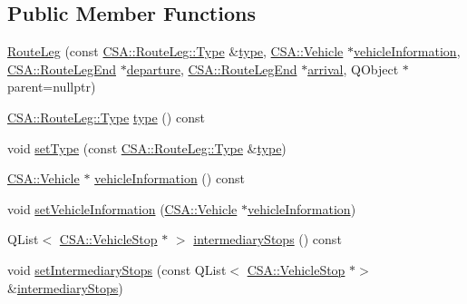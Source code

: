 \subsection*{Public Member Functions}
\begin{DoxyCompactItemize}
\item 
\mbox{\hyperlink{classCSA_1_1RouteLeg_a81e25540ddee7870c6304c6e6efd8490}{Route\+Leg}} (const \mbox{\hyperlink{classCSA_1_1RouteLeg_a464547cf160a77a2014d101560b1f77b}{C\+S\+A\+::\+Route\+Leg\+::\+Type}} \&\mbox{\hyperlink{classCSA_1_1RouteLeg_abbea7d9d097dbf9b7c87543b2a2e8aac}{type}}, \mbox{\hyperlink{classCSA_1_1Vehicle}{C\+S\+A\+::\+Vehicle}} $\ast$\mbox{\hyperlink{classCSA_1_1RouteLeg_a766608f69057a64427736f02de434654}{vehicle\+Information}}, \mbox{\hyperlink{classCSA_1_1RouteLegEnd}{C\+S\+A\+::\+Route\+Leg\+End}} $\ast$\mbox{\hyperlink{classCSA_1_1RouteLeg_adc49bfe6b5aef6f5a2c2bffa72540308}{departure}}, \mbox{\hyperlink{classCSA_1_1RouteLegEnd}{C\+S\+A\+::\+Route\+Leg\+End}} $\ast$\mbox{\hyperlink{classCSA_1_1RouteLeg_a096f128bcfa0e616bfab643f5b2c245f}{arrival}}, Q\+Object $\ast$parent=nullptr)
\item 
\mbox{\hyperlink{classCSA_1_1RouteLeg_a464547cf160a77a2014d101560b1f77b}{C\+S\+A\+::\+Route\+Leg\+::\+Type}} \mbox{\hyperlink{classCSA_1_1RouteLeg_abbea7d9d097dbf9b7c87543b2a2e8aac}{type}} () const
\item 
void \mbox{\hyperlink{classCSA_1_1RouteLeg_a8a175ba408df0aeb3a345f57ce65db5b}{set\+Type}} (const \mbox{\hyperlink{classCSA_1_1RouteLeg_a464547cf160a77a2014d101560b1f77b}{C\+S\+A\+::\+Route\+Leg\+::\+Type}} \&\mbox{\hyperlink{classCSA_1_1RouteLeg_abbea7d9d097dbf9b7c87543b2a2e8aac}{type}})
\item 
\mbox{\hyperlink{classCSA_1_1Vehicle}{C\+S\+A\+::\+Vehicle}} $\ast$ \mbox{\hyperlink{classCSA_1_1RouteLeg_a766608f69057a64427736f02de434654}{vehicle\+Information}} () const
\item 
void \mbox{\hyperlink{classCSA_1_1RouteLeg_a88faef67ebfa683c1ea15f8e672f16c3}{set\+Vehicle\+Information}} (\mbox{\hyperlink{classCSA_1_1Vehicle}{C\+S\+A\+::\+Vehicle}} $\ast$\mbox{\hyperlink{classCSA_1_1RouteLeg_a766608f69057a64427736f02de434654}{vehicle\+Information}})
\item 
Q\+List$<$ \mbox{\hyperlink{classCSA_1_1VehicleStop}{C\+S\+A\+::\+Vehicle\+Stop}} $\ast$ $>$ \mbox{\hyperlink{classCSA_1_1RouteLeg_a6cb78630def68232e02545f8803c7a27}{intermediary\+Stops}} () const
\item 
void \mbox{\hyperlink{classCSA_1_1RouteLeg_aa01b151e07580a55b7fec9a1cadfc9bb}{set\+Intermediary\+Stops}} (const Q\+List$<$ \mbox{\hyperlink{classCSA_1_1VehicleStop}{C\+S\+A\+::\+Vehicle\+Stop}} $\ast$$>$ \&\mbox{\hyperlink{classCSA_1_1RouteLeg_a6cb78630def68232e02545f8803c7a27}{intermediary\+Stops}})
$$
\end{DoxyCompactItemize}
